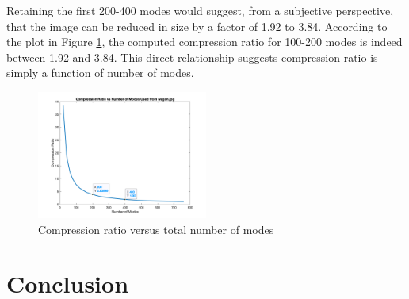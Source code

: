 \documentclass[conference]{IEEEtran}
\begin{document}
    Retaining the first 200-400 modes would suggest, from a subjective perspective, that the image can be reduced in size by a factor of 1.92 to 3.84. According to the plot in Figure \ref{fig:comprvsr}, the computed compression ratio for 100-200 modes is indeed between 1.92 and 3.84. This direct relationship suggests compression ratio is simply a function of number of modes.

    \begin{figure}[t]
    \includegraphics[width=0.5\textwidth]{comprVsModes_rgb}
    \caption{Compression ratio versus total number of modes}
    \label{fig:comprvsr}
    \end{figure}




    \section{Conclusion}
    

    \nocite{jaradet_svd_image_compression}
    \nocite{shlens_2014_tutorial}
    \nocite{omar_image_compression}
    \nocite{xu_color_conversion}
    \newpage
    {}
    
\end{document}
